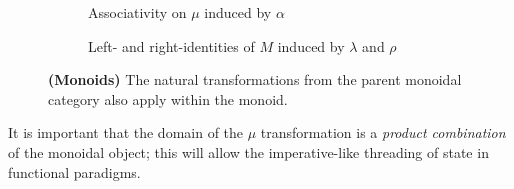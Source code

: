 \documentclass[10pt,a4paper,reqno]{amsart}
\numberwithin{equation}{section}
\numberwithin{figure}{section}
\begin{document}
\vspace{-2em}
\begin{figure}[ht]
        \begin{subfigure}{\textwidth}
                \centering
                \caption{Associativity on $\mu$ induced by $\alpha$}
        \end{subfigure}

        \begin{subfigure}{\textwidth}
                \centering
                \caption{Left- and right-identities of $M$ induced by $\lambda$
                        and $\rho$}
        \end{subfigure}%
        \caption{\textbf{(Monoids)} The natural transformations from the parent
                monoidal category also apply within the monoid.}
        \vspace{1.5em}
        \label{fig:monoid-commute}
\end{figure}

It is important that the domain of the $\mu$
transformation is a \emph{product combination} of the monoidal object; this will
allow the imperative-like threading of state in functional paradigms.
\end{document}
